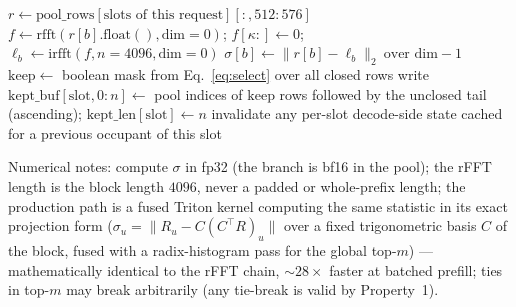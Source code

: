 \documentclass[11pt]{article}
\newcommand{\keep}{\mathrm{keep}}
\begin{document}
\begin{algorithm}[h]
\caption{Tier-1 selection at prefill end / block close (per MLA layer)}
\begin{algorithmic}[1]
\State $r \gets \text{pool\_rows}[\text{slots of this request}][:, 512{:}576]$
  \State $f \gets \mathrm{rfft}(r[b].\mathrm{float}(), \mathrm{dim}=0)$;
    $f[\kappa{:}] \gets 0$;
    $\ell_b \gets \mathrm{irfft}(f, n{=}4096, \mathrm{dim}=0)$
  \State $\sigma[b] \gets \lVert r[b] - \ell_b \rVert_2 \ \text{over dim} -1$
\EndFor
\State $\keep \gets$ boolean mask from Eq.~\eqref{eq:select} over all closed
  rows 
\State write $\mathrm{kept\_buf}[\mathrm{slot}, 0{:}n] \gets$ pool indices of
  $\keep$ rows followed by the unclosed tail (ascending);
  $\mathrm{kept\_len}[\mathrm{slot}] \gets n$
\State invalidate any per-slot decode-side state cached for a previous
  occupant of this slot 
\end{algorithmic}
\end{algorithm}

Numerical notes: compute $\sigma$ in fp32 (the branch is bf16 in the pool);
the rFFT length is the block length $4096$, never a padded or whole-prefix
length; the production path is a fused Triton kernel computing the same
statistic in its exact projection form
($\sigma_u = \lVert R_u - C(C^{\top}R)_u \rVert$ over a fixed trigonometric
basis $C$ of the block, fused with a radix-histogram pass for the global
top-$m$) --- mathematically identical to the rFFT chain, ${\sim}28\times$
faster at batched prefill; ties in top-$m$ may break arbitrarily (any
tie-break is valid by Property~1).
\end{document}
